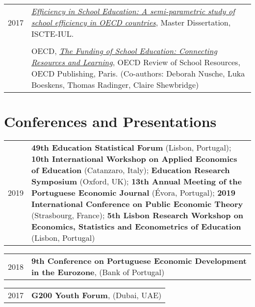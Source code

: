 \documentclass[a4paper,11pt]{article} %
\begin{document}
\begin{tabular}{r|p{13cm}}
	2017 & \href{http://hdl.handle.net/10071/16122}{\textit{Efficiency in School Education: A semi-parametric study of school efficiency in OECD countries}}, Master Dissertation, ISCTE-IUL.\\
	& \\
	& OECD, \href{http://www.oecd.org/governance/the-funding-of-school-education-9789264276147-en.htm}{\textit{The Funding of School Education: Connecting Resources and Learning}}, OECD Review of School Resources, OECD Publishing, Paris. (Co-authors: Deborah Nusche, Luka Boeskens, Thomas Radinger, Claire Shewbridge)\\
\end{tabular}


\section[Conferences and Presentations]{\faCommentsO \hspace{3pt} Conferences and Presentations}

\begin{tabular}{r|p{13cm}}
	2019 & \textbf{49th Education Statistical Forum} (Lisbon, Portugal); \textbf{10th International Workshop on Applied Economics of Education} (Catanzaro, Italy); \textbf{Education Research Symposium} (Oxford, UK); \textbf{13th Annual Meeting of the Portuguese Economic Journal} (Évora, Portugal); \textbf{2019 International Conference on Public Economic Theory} (Strasbourg, France); \textbf{5th Lisbon Research Workshop on Economics, Statistics and Econometrics of Education} (Lisbon, Portugal)  \\
\end{tabular}


\begin{tabular}{r|p{13cm}}
	2018 & \textbf{9th Conference on Portuguese Economic Development in the Eurozone}, (Bank of Portugal)
\end{tabular}

\begin{tabular}{r|p{13cm}}
	2017 & \textbf{G200 Youth Forum}, (Dubai, UAE) \\

\end{tabular}

\end{document}
